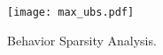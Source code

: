 
\begin{figure}
	\centering
	\setlength{\belowcaptionskip}{-0.3cm}
	\setlength{\abovecaptionskip}{0cm}
	\texttt{[image: max\_ubs.pdf]}
	\caption{Behavior Sparsity Analysis.}
	\label{fig:BehaviorSparsityAnalysis}
\end{figure}
